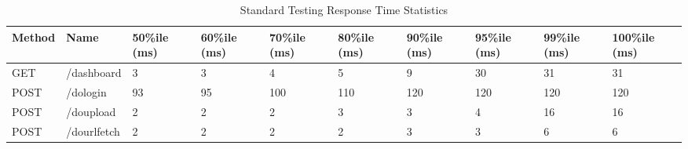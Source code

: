 \begin{table*}[]
  \caption{Standard Testing Response Time Statistics}
  \label{tab:stdrespstat}
  \begin{tabular}{|p{}|p{}|p{}|p{}|p{}|p{}|p{}|p{}|p{}|p{}|}
    \hline
  {\textbf{Method}} & {\textbf{Name}} & {\textbf{50\%ile (ms)}} & {\textbf{60\%ile (ms)}} & {\textbf{70\%ile (ms)}} & {\textbf{80\%ile (ms)}} & {\textbf{90\%ile (ms)}} & {\textbf{95\%ile (ms)}} & {\textbf{99\%ile (ms)}} & {\textbf{100\%ile (ms)}} \\ \hline
  GET                                   & /dashboard                         & 3                                          & 3                                          & 4                                          & 5                                          & 9                                          & 30                                         & 31                                         & 31                                          \\ \hline
  {\color[HTML]{2A2B2E} POST}           & /dologin                           & 93                                         & 95                                         & 100                                        & 110                                        & 120                                        & 120                                        & 120                                        & 120                                         \\ \hline
  {\color[HTML]{2A2B2E} POST}           & /doupload                          & 2                                          & 2                                          & 2                                          & 3                                          & 3                                          & 4                                          & 16                                         & 16                                          \\ \hline
  POST                                  & /dourlfetch                        & 2                                          & 2                                          & 2                                          & 2                                          & 3                                          & 3                                          & 6                                          & 6                                           \\ \hline

\end{tabular}
\end{table*}
